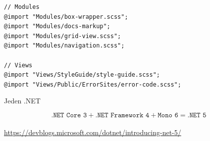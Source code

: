 \documentclass[utf8x]{beamer}
\begin{document}
\begin{frame}[fragile]
    \begin{center}
\begin{verbatim}
// Modules
@import "Modules/box-wrapper.scss";
@import "Modules/docs-markup";
@import "Modules/grid-view.scss";
@import "Modules/navigation.scss";

// Views
@import "Views/StyleGuide/style-guide.scss";
@import "Views/Public/ErrorSites/error-code.scss";
\end{verbatim}
    \end{center}
\end{frame}


\begin{frame}
    \begin{center}
        \color{vulkan}
        \Huge \textrm{Jeden .NET}
    \end{center}
\end{frame}


\begin{frame}
    \large
    \ttfamily
    \begin{equation*}
        \texttt{.NET Core 3} + \texttt{.NET Framework 4} + \texttt{Mono 6} = \texttt{.NET 5}
    \end{equation*}
    \\
    \centering
    \tiny\url{https://devblogs.microsoft.com/dotnet/introducing-net-5/}
\end{frame}
\end{document}
